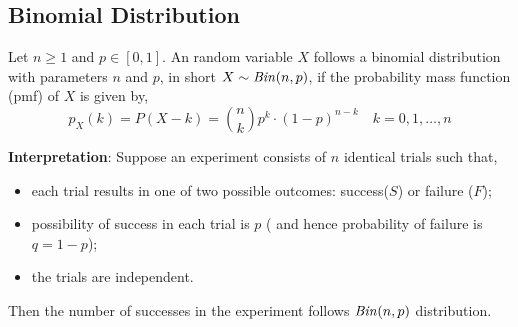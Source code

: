 \subsection{Binomial Distribution}
\begin{definition}
    Let $n \geq 1$ and $p \in [0, 1]$. An random variable $X$ follows a
binomial distribution with parameters $n$ and $p$, in short $X \sim
\text{\emph{Bin}}(n, p)$, if the probability mass function (pmf) of $X$ is given
by,
    \begin{equation*}
        p_X(k) = P(X - k) = {n \choose k}p^k \cdot (1-p)^{n-k}
        \quad
        k = 0, 1, \dots, n
    \end{equation*}
\end{definition}
\noindent
\textbf{Interpretation}: Suppose an experiment consists of $n$ identical trials
such that, 
\begin{itemize}[noitemsep, topsep=0em]
\item
    each trial results in one of two possible outcomes: success($S$) or failure
    ($F$);
\item
    possibility of success in each trial is $p$ ( and hence probability of
    failure is $q = 1 - p$);
\item
    the trials are independent.
\end{itemize}
Then the number of successes in the experiment follows $\text{\emph{Bin}}(n, p)$
distribution.
